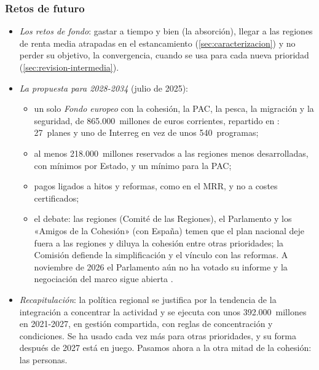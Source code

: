 \documentclass[11pt]{article}
\begin{document}
\subsubsection{Retos de futuro}\label{sec:retos-regional}

\begin{itemize}
\item \emph{Los retos de fondo}: gastar a tiempo y bien (la absorción), llegar a las regiones de renta media atrapadas en el estancamiento (\ref{sec:caracterizacion}) y no perder su objetivo, la convergencia, cuando se usa para cada nueva prioridad (\ref{sec:revision-intermedia}).
\item \emph{La propuesta para 2028-2034} (julio de 2025)\nocite{CE2025PropuestaFondo}:
  \begin{itemize}
  \item un solo \emph{Fondo europeo} con la cohesión, la PAC, la pesca, la migración y la seguridad, de 865.000~millones de euros corrientes, repartido en : 27~planes y uno de Interreg en vez de unos 540~programas;
  \item al menos 218.000~millones reservados a las regiones menos desarrolladas, con mínimos por Estado, y un mínimo para la PAC;
  \item pagos ligados a hitos y reformas, como en el MRR, y no a costes certificados;
  \item el debate: las regiones (Comité de las Regiones), el Parlamento y los «Amigos de la Cohesión» (con España) temen que el plan nacional deje fuera a las regiones y diluya la cohesión entre otras prioridades; la Comisión defiende la simplificación y el vínculo con las reformas. A noviembre de 2026 el Parlamento aún no ha votado su informe y la negociación del marco sigue abierta .
  \end{itemize}
\end{itemize}

\begin{itemize}
\item \emph{Recapitulación}: la política regional se justifica por la tendencia de la integración a concentrar la actividad y se ejecuta con unos 392.000~millones en 2021-2027, en gestión compartida, con reglas de concentración y condiciones. Se ha usado cada vez más para otras prioridades, y su forma después de 2027 está en juego. Pasamos ahora a la otra mitad de la cohesión: las personas.
\end{itemize}
\end{document}
